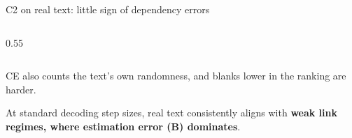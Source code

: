 \documentclass[aspectratio=169,10pt,t]{beamer}
\newcommand{\fnote}[1]{{\color{ink2}\scriptsize #1\par}}
\newcommand{\B}{{\color{est}\firasemibold (B)}\xspace}
\begin{document}
\begin{frame}{C2 on real text: little sign of dependency errors}
\begin{columns}[T,onlytextwidth]
\begin{column}{0.55\textwidth}
\begin{tabular}{@{}l l l@{}}
        \bottomrule
      \end{tabular}
      \par\vspace{0.8mm}
      \fnote{CE also counts the text's own randomness, and blanks lower in the ranking are harder.}
      \vspace{1.5mm}
      \begin{takeaway}[fontupper=\scriptsize]
        At standard decoding step sizes, real text consistently aligns with \textbf{weak link regimes,
        where estimation error \B dominates}.
      \end{takeaway}
    \end{column}
  \end{columns}
\end{frame}

\end{document}
